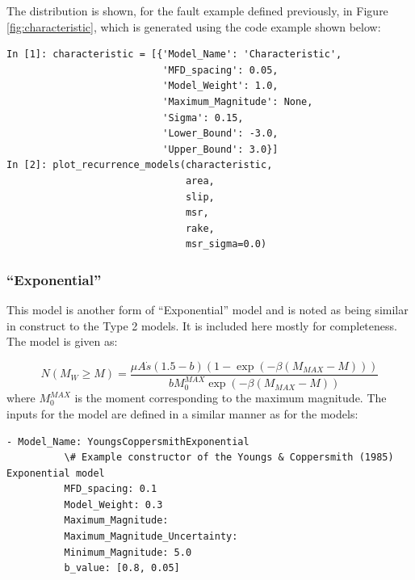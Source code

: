 The distribution is shown, for the fault example defined previously, in Figure \ref{fig:characteristic}, which is generated using the code example shown below:

\begin{Verbatim}[frame=single, commandchars=\\\{\}, fontsize=\scriptsize]
In [1]: characteristic = [{'Model_Name': 'Characteristic',
                           'MFD_spacing': 0.05,
                           'Model_Weight': 1.0,
                           'Maximum_Magnitude': None,
                           'Sigma': 0.15, 
                           'Lower_Bound': -3.0, 
                           'Upper_Bound': 3.0}]
In [2]: plot_recurrence_models(characteristic,
                               area,
                               slip,
                               msr,
                               rake,
                               msr_sigma=0.0)
\end{Verbatim}                               



\subsubsection{\cite{YoungsCoppersmith1985} ``Exponential''}

This model is another form of ``Exponential'' model and is noted as being similar in construct to the \cite{AndersonLuco1983} Type 2 models. It is included here mostly for completeness. The model is given as:

\begin{equation}
N \left( {M_W \geq M} \right) = \frac{\mu A \dot{s} \left( {1.5 - b} \right) \left( {1 - \exp \left( {-\beta \left( {M_{MAX} - M} \right)} \right)} \right)}{b M_{0}^{MAX} \exp \left( {-\beta \left( {M_{MAX} - M} \right)} \right)}
\end{equation}
where $M_0^{MAX}$ is the moment corresponding to the maximum magnitude. The inputs for the model are defined in a similar manner as for the \cite{AndersonLuco1983} models:

\begin{Verbatim}[frame=single, commandchars=\\\{\}, fontsize=\scriptsize]
        - Model_Name: YoungsCoppersmithExponential
          \# Example constructor of the Youngs & Coppersmith (1985) Exponential model
          MFD_spacing: 0.1
          Model_Weight: 0.3
          Maximum_Magnitude:
          Maximum_Magnitude_Uncertainty:
          Minimum_Magnitude: 5.0
          b_value: [0.8, 0.05]
\end{Verbatim}


